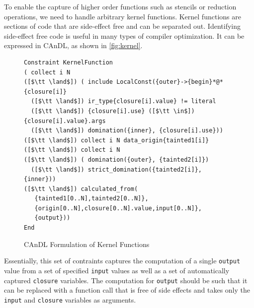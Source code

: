 


\newpage

    To enable the capture of higher order functions such as stencils or
    reduction operations, we need to handle arbitrary kernel functions.
    Kernel functions are sections of code that are side-effect free and
    can be separated out. Identifying side-effect free code is useful in
    many types of compiler optimization.  It can be expressed in CAnDL, as
    shown in \autoref{fig:kernel}.

\begin{figure}[ht]
\begin{lstlisting}[language=CAnDL]
Constraint KernelFunction
( collect i N
([$\tt \land$]) ( include LocalConst({outer}->{begin}*@*{closure[i]}
  ([$\tt \land$]) ir_type{closure[i].value} != literal
  ([$\tt \land$]) {closure[i].use} ([$\tt \in$]) {closure[i].value}.args
  ([$\tt \land$]) domination({inner}, {closure[i].use}))
([$\tt \land$]) collect i N data_origin{tainted1[i]}
([$\tt \land$]) collect i N
([$\tt \land$]) ( domination({outer}, {tainted2[i]})
  ([$\tt \land$]) strict_domination({tainted2[i]}, {inner}))
([$\tt \land$]) calculated_from(
   {tainted1[0..N],tainted2[0..N]},
   {origin[0..N],closure[0..N].value,input[0..N]},
   {output}))
End
\end{lstlisting}
\vspace{-0.3cm}
\caption{CAnDL Formulation of Kernel Functions}
\label{fig:kernel}
\end{figure}

    Essentially, this set of contraints captures the computation of a
    single \texttt{output} value from a set of specified \texttt{input}
    values as well as a set of automatically captured \texttt{closure}
    variables.  The computation for \texttt{output} should be such that it
    can be replaced with a function call that is free of side effects and
    takes only the \texttt{input} and \texttt{closure} variables as
    arguments.

